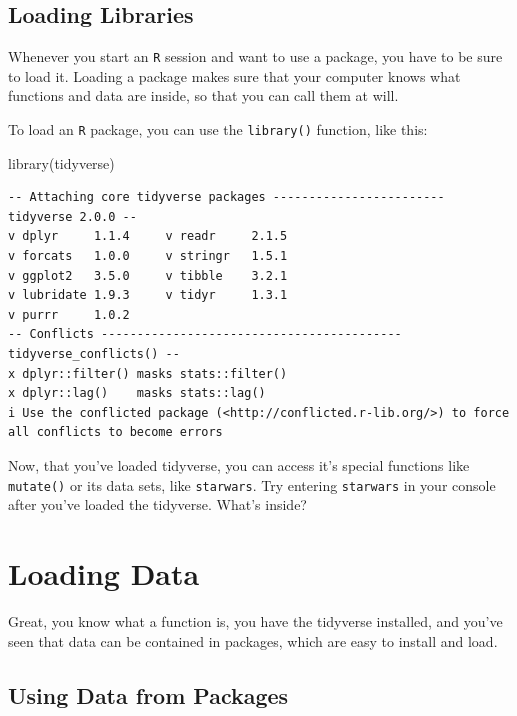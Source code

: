 \documentclass[
  letterpaper,
]{book}
\newenvironment{Shaded}{\begin{snugshade}}{\end{snugshade}}
\newcommand{\FunctionTok}[1]{\textcolor[rgb]{0.28,0.35,0.67}{#1}}
\newcommand{\NormalTok}[1]{\textcolor[rgb]{0.00,0.23,0.31}{#1}}
\begin{document}
\hypertarget{loading-libraries}{%
\subsection{Loading Libraries}\label{loading-libraries}}

Whenever you start an \texttt{R} session and want to use a package, you
have to be sure to load it. Loading a package makes sure that your
computer knows what functions and data are inside, so that you can call
them at will.

To load an \texttt{R} package, you can use the \texttt{library()}
function, like this:

\begin{Shaded}
\begin{Highlighting}[]
\FunctionTok{library}\NormalTok{(tidyverse)}
\end{Highlighting}
\end{Shaded}

\begin{verbatim}
-- Attaching core tidyverse packages ------------------------ tidyverse 2.0.0 --
v dplyr     1.1.4     v readr     2.1.5
v forcats   1.0.0     v stringr   1.5.1
v ggplot2   3.5.0     v tibble    3.2.1
v lubridate 1.9.3     v tidyr     1.3.1
v purrr     1.0.2     
-- Conflicts ------------------------------------------ tidyverse_conflicts() --
x dplyr::filter() masks stats::filter()
x dplyr::lag()    masks stats::lag()
i Use the conflicted package (<http://conflicted.r-lib.org/>) to force all conflicts to become errors
\end{verbatim}

Now, that you've loaded tidyverse, you can access it's special functions
like \texttt{mutate()} or its data sets, like \texttt{starwars}. Try
entering \texttt{starwars} in your console after you've loaded the
tidyverse. What's inside?

\hypertarget{loading-data}{%
\section{Loading Data}\label{loading-data}}

Great, you know what a function is, you have the tidyverse installed,
and you've seen that data can be contained in packages, which are easy
to install and load.

\hypertarget{using-data-from-packages}{%
\subsection{Using Data from Packages}\label{using-data-from-packages}}
\end{document}
